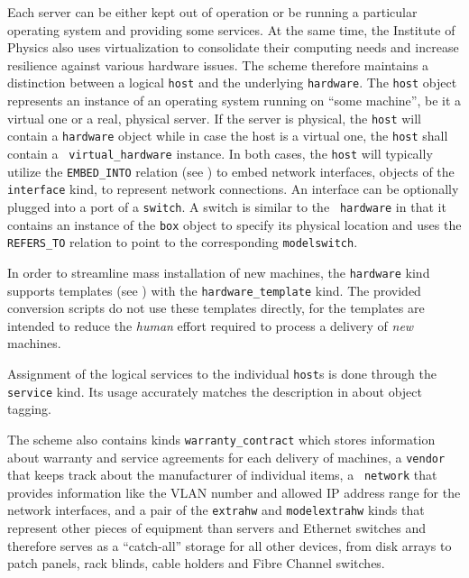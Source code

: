\documentclass[deska]{subfiles}
\begin{document}
Each server can be either kept out of operation or be running a particular operating system and providing some services.
At the same time, the Institute of Physics also uses virtualization to consolidate their computing needs and increase
resilience against various hardware issues.  The scheme therefore maintains a distinction between a logical {\tt host}
and the underlying {\tt hardware}.  The {\tt host} object represents an instance of an operating system running on
``some machine'', be it a virtual one or a real, physical server.  If the server is physical, the {\tt host} will
contain a {\tt hardware} object while in case the host is a virtual one, the {\tt host} shall contain a {\tt
virtual\_hardware} instance.  In both cases, the {\tt host} will typically utilize the {\tt EMBED\_INTO} relation (see
) to embed network interfaces, objects of the {\tt interface} kind, to represent network
connections.  An interface can be optionally plugged into a port of a {\tt switch}.  A switch is similar to the {\tt
hardware} in that it contains an instance of the {\tt box} object to specify its physical location and uses the {\tt
REFERS\_TO} relation to point to the corresponding {\tt modelswitch}.

In order to streamline mass installation of new machines, the {\tt hardware} kind supports templates (see
) with the {\tt hardware\_template} kind.  The provided conversion scripts do not use
these templates directly, for the templates are intended to reduce the {\em human} effort required to process a delivery
of {\em new} machines.

Assignment of the logical services to the individual {\tt host}s is done through the {\tt service} kind.  Its usage
accurately matches the description in  about object tagging.

The scheme also contains kinds {\tt warranty\_contract} which stores information about warranty and service agreements
for each delivery of machines, a {\tt vendor} that keeps track about the manufacturer of individual items, a {\tt
network} that provides information like the VLAN number and allowed IP address range for the network interfaces, and a
pair of the {\tt extrahw} and {\tt modelextrahw} kinds that represent other pieces of equipment than servers and
Ethernet switches and therefore serves as a ``catch-all'' storage for all other devices, from disk arrays to patch
panels, rack blinds, cable holders and Fibre Channel switches.
\end{document}
